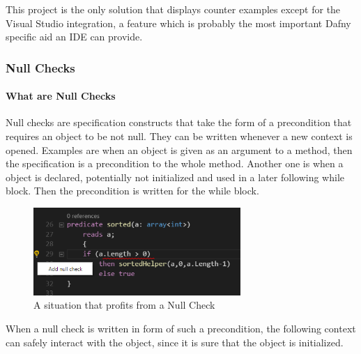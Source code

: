 This project is the only solution that displays counter examples except for the Visual Studio integration, a feature which is probably the most important Dafny specific aid an IDE can provide. 


\subsubsection{Null Checks}
\paragraph{What are Null Checks}
Null checks are specification constructs that take the form of a precondition that requires an object to be not null. They can be written whenever a new context is opened. Examples are when an object is given as an argument to a method, then the specification is a precondition to the whole method. Another one is when a object is declared, potentially not initialized and used in a later following while block. Then the precondition is written for the while block.\newline

\begin{figure}[H]
	\centering
	\includegraphics[width=0.7\textwidth]{img/nullCheck}
	\caption{A situation that profits from a Null Check}
	\label{fig:dfnullcheck}
\end{figure}

When a null check is written in form of such a precondition, the following context can safely interact with the object, since it is sure that the object is initialized. 

